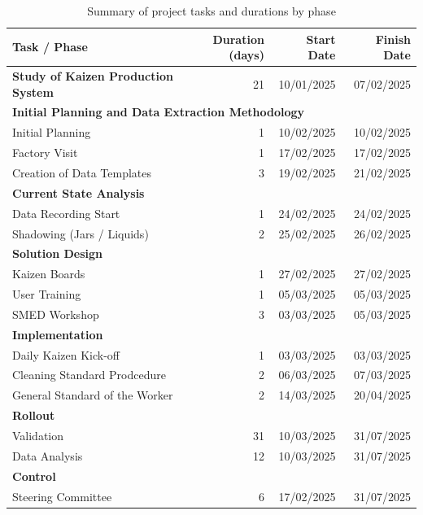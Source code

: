 \begin{table}[ht]
\centering
\renewcommand{\arraystretch}{1.3}
\begin{tabular}{lrrr}
\hline
\textbf{Task / Phase} & \textbf{Duration (days)} & \textbf{Start Date} & \textbf{Finish Date} \\
\hline
\quad \textbf{Study of Kaizen Production System} & 21 & 10/01/2025 & 07/02/2025 \\
\hline
\multicolumn{4}{l}{\textbf{Initial Planning and Data Extraction Methodology}} \\
\quad Initial Planning & 1 & 10/02/2025 & 10/02/2025 \\
\quad Factory Visit & 1 & 17/02/2025 & 17/02/2025 \\
\quad Creation of Data Templates & 3 & 19/02/2025 & 21/02/2025 \\
\hline
\multicolumn{4}{l}{\textbf{Current State Analysis}} \\
\quad Data Recording Start & 1 & 24/02/2025 & 24/02/2025 \\
\quad Shadowing (Jars / Liquids) & 2 & 25/02/2025 & 26/02/2025 \\
\hline
\multicolumn{4}{l}{\textbf{Solution Design}} \\
\quad Kaizen Boards & 1 & 27/02/2025 & 27/02/2025 \\
\quad User Training & 1 & 05/03/2025 & 05/03/2025 \\
\quad SMED Workshop & 3 & 03/03/2025 & 05/03/2025 \\
\hline
\multicolumn{4}{l}{\textbf{Implementation}} \\
\quad Daily Kaizen Kick-off & 1 & 03/03/2025 & 03/03/2025 \\
\quad Cleaning Standard Prodcedure & 2 & 06/03/2025 & 07/03/2025 \\
\quad General Standard of the Worker & 2 & 14/03/2025 & 20/04/2025 \\
\hline
\multicolumn{4}{l}{\textbf{Rollout}} \\
\quad Validation & 31 & 10/03/2025 & 31/07/2025 \\
\quad Data Analysis & 12 & 10/03/2025 & 31/07/2025 \\
\hline
\multicolumn{4}{l}{\textbf{Control}} \\
\quad Steering Committee & 6 & 17/02/2025 & 31/07/2025 \\
\hline
\end{tabular}
\caption{Summary of project tasks and durations by phase}
\label{tab:project_tasks_concise}
\end{table}

